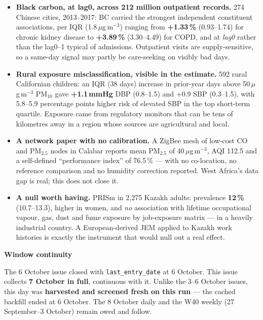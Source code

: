 \documentclass[10pt]{article}
\begin{document}
\footnotesize
\begin{itemize}

\item \textbf{Black carbon, at lag0, across 212 million outpatient records.} 274 Chinese cities, 2013--2017:
BC carried the strongest independent constituent associations, per IQR (1.8\,$\mu$g\,m$^{-3}$) ranging from
\textbf{+1.33\,\%} (0.93--1.74) for chronic kidney disease to \textbf{+3.89\,\%} (3.30--4.49) for COPD, and
at \textit{lag0} rather than the lag0--1 typical of admissions. Outpatient visits are supply-sensitive, so
a same-day signal may partly be care-seeking on visibly bad days.

\item \textbf{Rural exposure misclassification, visible in the estimate.} 592 rural Californian children: an
IQR (38 days) increase in prior-year days above 50\,$\mu$g\,m$^{-3}$ PM$_{10}$ gave \textbf{+1.1\,mmHg} DBP
(0.8--1.5) and +0.9 SBP (0.3--1.5), with 5.8--5.9 percentage points higher risk of elevated SBP in the top
short-term quartile. Exposure came from regulatory monitors that can be tens of kilometres away in a
region whose sources are agricultural and local.

\item \textbf{A network paper with no calibration.} A ZigBee mesh of low-cost CO and PM$_{2.5}$ nodes in
Calabar reports mean PM$_{2.5}$ of 40\,$\mu$g\,m$^{-3}$, AQI 112.5 and a self-defined
``performance index'' of 76.5\,\% --- with no co-location, no reference comparison and no humidity
correction reported. West Africa's data gap is real; this does not close it.

\item \textbf{A null worth having.} PRISm in 2,275 Kazakh adults: prevalence \textbf{12\,\%} (10.7--13.3),
higher in women, and \textit{no} association with lifetime occupational vapour, gas, dust and fume exposure
by job-exposure matrix --- in a heavily industrial country. A European-derived JEM applied to Kazakh work
histories is exactly the instrument that would null out a real effect.

\end{itemize}

\vspace{2mm}

\begin{keybox}
{\sffamily\bfseries\footnotesize\color{Deep}Window continuity}\\[1.2mm]
{\fontsize{7.2}{8.8}\selectfont
The 6 October issue closed with \texttt{last\_entry\_date} at 6 October. This issue collects
\textbf{7 October in full}, continuous with it. Unlike the 3--6 October issues, this day was
\textbf{harvested and screened fresh on this run} --- the cached backfill ended at 6 October. The 8 October
daily and the W40 weekly (27 September--3 October) remain owed and follow.\par}
\end{keybox}
\end{document}
